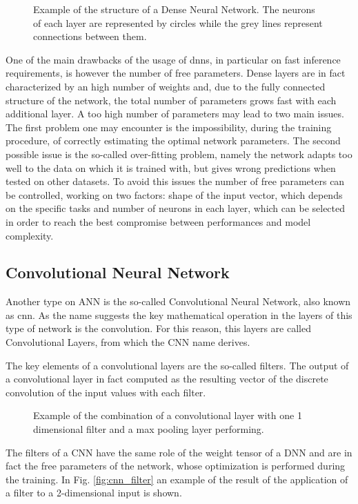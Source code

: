 \documentclass[../../main.tex]{subfiles}
\begin{document}
\begin{figure}[h]
    \centering
    
    \caption{Example of the structure of a Dense Neural Network. The neurons of each layer are represented by circles while the grey lines represent connections between them.}
    \label{fig:dnn_example}
\end{figure}

One of the main drawbacks of the usage of \acrshort{dnn}s, in particular on fast inference requirements, is however the number of free parameters. Dense layers are in fact characterized by an high number of weights and, due to the fully connected structure of the network, the total number of parameters grows fast with each additional layer. 
A too high number of parameters may lead to two main issues. The first problem one may encounter is the impossibility, during the training procedure, of correctly estimating the optimal network parameters. The second possible issue is the so-called over-fitting problem, namely the network adapts too well to the data on which it is trained with, but gives wrong predictions when tested on other datasets.  
To avoid this issues the number of free parameters can be controlled, working on two factors:  shape of the input vector, which depends on the specific tasks and  number of neurons in each layer, which can be selected in order to reach the best compromise between performances and model complexity.
        
\subsection{Convolutional Neural Network}
\label{sec:CNN}

Another type on ANN is the so-called Convolutional Neural Network, also known as \acrshort{cnn}. As the name suggests the key mathematical operation in the layers of this type of network is the convolution. For this reason, this layers are called Convolutional Layers, from which the CNN name derives.

The key elements of a convolutional layers are the so-called filters. The output of a convolutional layer in fact computed as the resulting vector of the discrete convolution of the input values with each filter. 

\begin{figure}
    \centering
    
    \caption{Example of the combination of a convolutional layer with one 1 dimensional filter and a max pooling layer performing.  }
    \label{fig:cnn_tot}
\end{figure}
The filters of a CNN have the same role of the weight tensor of a DNN and are in fact the free parameters of the network, whose optimization is performed during the training. In Fig. \ref{fig:cnn_filter} an example of the result of the application of a filter to a 2-dimensional input is shown.
\end{document}
